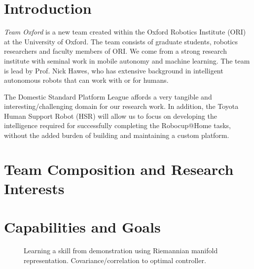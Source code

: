 \documentclass[runningheads,a4paper]{llncs}
\begin{document}
\section{Introduction}
\textit{Team Oxford} is a new team created within the Oxford Robotics Institute
(ORI) at the University of Oxford. The team consists of graduate students,
robotics researchers and faculty members of ORI. We come from a strong research
institute with seminal work in mobile autonomy and machine learning.
The team is lead by Prof. Nick Hawes, who has extensive background in
intelligent autonomous robots that can work with or for humans.

The Domestic Standard Platform League affords a very tangible and 
interesting/challenging domain for our research work. In addition, the
Toyota Human Support Robot (HSR) will allow us to focus on developing the
intelligence required for successfully completing the Robocup@Home tasks, 
without the added burden of building and maintaining a custom platform.


\section{Team Composition and Research Interests}

\section{Capabilities and Goals}

\begin{figure}[!ht]
	\centering
	\caption{Learning a skill from demonstration using Riemannian manifold representation. Covariance/correlation to optimal controller.}
	\label{fig:baxter_water_task}
\end{figure}
\end{document}
